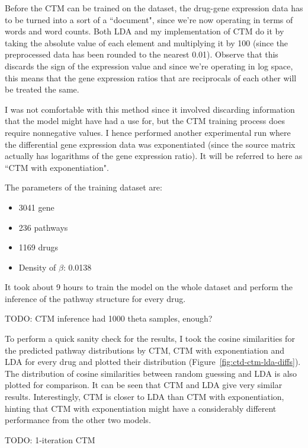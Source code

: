 \documentclass[12pt,a4paper,twoside,openright]{report}
\begin{document}
Before the CTM can be trained on the dataset, the drug-gene expression data has to be turned into a sort of a ``document", since we're now operating in terms of words and word counts. Both LDA and my implementation of CTM do it by taking the absolute value of each element and multiplying it by 100 (since the preprocessed data has been rounded to the nearest 0.01). Observe that this discards the sign of the expression value and since we're operating in log space, this means that the gene expression ratios that are reciprocals of each other will be treated the same.

I was not comfortable with this method since it involved discarding information that the model might have had a use for, but the CTM training process does require nonnegative values. I hence performed another experimental run where the differential gene expression data was exponentiated (since the source matrix actually has logarithms of the gene expression ratio). It will be referred to here as ``CTM with exponentiation".

The parameters of the training dataset are:
\begin{itemize}[noitemsep]
\item 3041 gene
\item 236 pathways
\item 1169 drugs
\item Density of $\beta$: 0.0138
\end{itemize}

It took about 9 hours to train the model on the whole dataset and perform the inference of the pathway structure for every drug.

TODO: CTM inference had 1000 theta samples, enough?

To perform a quick sanity check for the results, I took the cosine similarities for the predicted pathway distributions by CTM, CTM with exponentiation and LDA for every drug and plotted their distribution (Figure~\ref{fig:ctd-ctm-lda-diffs}). The distribution of cosine similarities between random guessing and LDA is also plotted for comparison. It can be seen that CTM and LDA give very similar results. Interestingly, CTM is closer to LDA than CTM with exponentiation, hinting that CTM with exponentiation might have a considerably different performance from the other two models.

TODO: 1-iteration CTM
\end{document}
